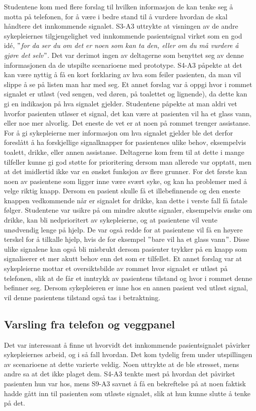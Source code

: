 \noindent
Studentene kom med flere forslag til hvilken informasjon de kan tenke seg å motta på telefonen, for å være i bedre stand til å vurdere hvordan de skal håndtere det innkommende signalet. S3-A3 uttrykte at visningen av de andre sykepleiernes tilgjengelighet ved innkommende pasientsignal virket som en god idé, \emph{$"$for da ser du om det er noen som kan ta den, eller om du må vurdere å gjøre det selv$"$}. Det var derimot ingen av deltagerne som benyttet seg av denne informasjonen da de utspilte scenarioene med prototype. S4-A3 påpekte at det kan være nyttig å få en kort forklaring av hva som feiler pasienten, da man vil slippe å se på listen man har med seg. Et annet forslag var å oppgi hvor i rommet signalet er utløst (ved sengen, ved døren, på toalettet og lignende), da dette kan gi en indikasjon på hva signalet gjelder. Studentene påpekte at man aldri vet hvorfor pasienten utløser et signal, det kan være at pasienten vil ha et glass vann, eller noe mer alvorlig. Det eneste de vet er at noen på rommet trenger assistanse. For å gi sykepleierne mer informasjon om hva signalet gjelder ble det derfor foreslått å ha forskjellige signalknapper for pasientenes ulike behov, eksempelvis toalett, drikke, eller annen assistanse. Deltagerne kom  frem til at dette i mange tilfeller kunne gi god støtte for prioritering dersom man allerede var opptatt, men at det imidlertid ikke var en ønsket funksjon av flere grunner. For det første kan noen av pasientene som ligger inne være svært syke, og kan ha problemer med å velge riktig knapp. Dersom en pasient skulle få et illebefinnende og den eneste knappen vedkommende når er signalet for drikke, kan dette i verste fall få fatale følger. Studentene var usikre på om mindre akutte signaler, eksempelvis ønske om drikke, kan bli nedprioritert av sykepleierne, og at pasientene vil  vente unødvendig lenge på hjelp. De var også redde for at pasientene vil få en høyere terskel for å tilkalle hjelp, hvis de for eksempel $"$bare vil ha et glass vann$"$. Disse ulike signalene kan også bli misbrukt dersom pasienter trykker på en knapp som signaliserer et mer akutt behov enn det som er tilfellet. Et annet forslag var at sykepleierne mottar et oversiktsbilde av rommet hvor signalet er utløst på telefonen, slik at de får et inntrykk av pasientens tilstand og hvor i rommet denne befinner seg. Dersom sykepleieren er inne hos en annen pasient ved utløst signal, vil denne pasientens tilstand også tas i betraktning. 

\subsection{Varsling fra telefon og veggpanel}
Det var interessant å finne ut hvorvidt det innkommende pasientsignalet påvirker sykepleiernes arbeid, og i så fall hvordan. Det kom tydelig frem under utspillingen av scenarioene at dette varierte veldig. Noen uttrykte at de ble stresset, mens andre sa at det ikke plaget dem. S4-A3 tenkte mest på hvordan det påvirket pasienten hun var hos, mens S9-A3 savnet å få en bekreftelse på at noen faktisk hadde gått inn til pasienten som utløste signalet, slik at hun kunne slutte å tenke på det. 

